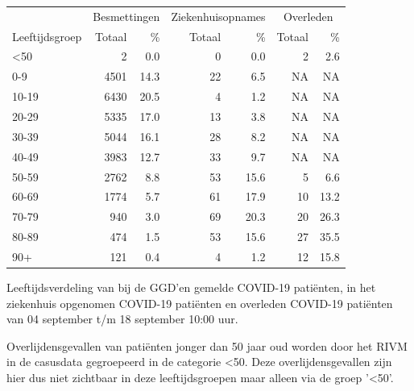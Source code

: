 \documentclass[
  english,
  man,floatsintext]{apa6}
\begin{document}
\begin{table}
\centering\begingroup\fontsize{11}{13}\selectfont

\begin{threeparttable}
\begin{tabular}{lrrrrrr}
\toprule
\multicolumn{1}{c}{ } & \multicolumn{2}{c}{Besmettingen} & \multicolumn{2}{c}{Ziekenhuisopnames} & \multicolumn{2}{c}{Overleden} \\
\cmidrule(l{3pt}r{3pt}){2-3} \cmidrule(l{3pt}r{3pt}){4-5} \cmidrule(l{3pt}r{3pt}){6-7}
Leeftijdsgroep & Totaal & \% & Totaal & \% & Totaal & \%\\
\midrule
<50 & 2 & 0.0 & 0 & 0.0 & 2 & 2.6\\
0-9 & 4501 & 14.3 & 22 & 6.5 & NA & NA\\
10-19 & 6430 & 20.5 & 4 & 1.2 & NA & NA\\
20-29 & 5335 & 17.0 & 13 & 3.8 & NA & NA\\
30-39 & 5044 & 16.1 & 28 & 8.2 & NA & NA\\
40-49 & 3983 & 12.7 & 33 & 9.7 & NA & NA\\
50-59 & 2762 & 8.8 & 53 & 15.6 & 5 & 6.6\\
60-69 & 1774 & 5.7 & 61 & 17.9 & 10 & 13.2\\
70-79 & 940 & 3.0 & 69 & 20.3 & 20 & 26.3\\
80-89 & 474 & 1.5 & 53 & 15.6 & 27 & 35.5\\
90+ & 121 & 0.4 & 4 & 1.2 & 12 & 15.8\\
\bottomrule
\end{tabular}
\begin{tablenotes}
\item[1] Leeftijdsverdeling van bij de GGD’en gemelde COVID-19 patiënten, in het ziekenhuis opgenomen COVID-19 patiënten en overleden COVID-19 patiënten van 04 september t/m 18 september 10:00 uur.
\item[2] Overlijdensgevallen van patiënten jonger dan 50 jaar oud worden door het RIVM in de casusdata gegroepeerd in de categorie <50. Deze overlijdensgevallen zijn hier dus niet zichtbaar in deze leeftijdsgroepen maar alleen via de groep '<50'.
\end{tablenotes}
\end{threeparttable}
\endgroup{}
\end{table}

\newpage
\end{document}
